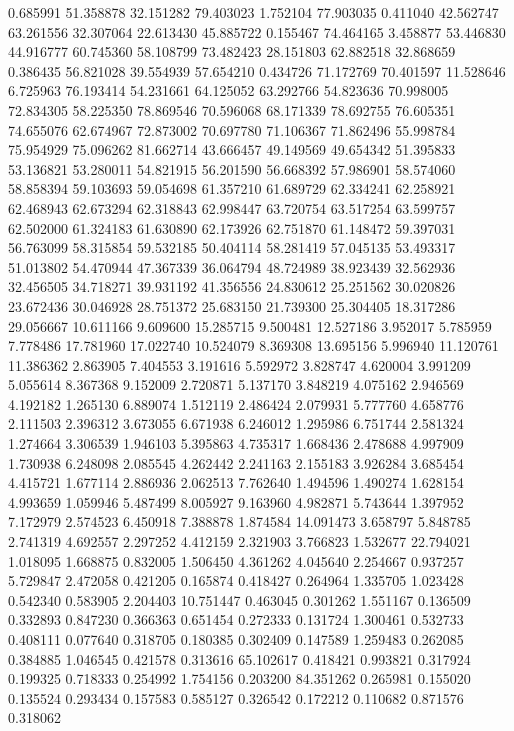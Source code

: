 0.685991
51.358878
32.151282
79.403023
1.752104
77.903035
0.411040
42.562747
63.261556
32.307064
22.613430
45.885722
0.155467
74.464165
3.458877
53.446830
44.916777
60.745360
58.108799
73.482423
28.151803
62.882518
32.868659
0.386435
56.821028
39.554939
57.654210
0.434726
71.172769
70.401597
11.528646
6.725963
76.193414
54.231661
64.125052
63.292766
54.823636
70.998005
72.834305
58.225350
78.869546
70.596068
68.171339
78.692755
76.605351
74.655076
62.674967
72.873002
70.697780
71.106367
71.862496
55.998784
75.954929
75.096262
81.662714
43.666457
49.149569
49.654342
51.395833
53.136821
53.280011
54.821915
56.201590
56.668392
57.986901
58.574060
58.858394
59.103693
59.054698
61.357210
61.689729
62.334241
62.258921
62.468943
62.673294
62.318843
62.998447
63.720754
63.517254
63.599757
62.502000
61.324183
61.630890
62.173926
62.751870
61.148472
59.397031
56.763099
58.315854
59.532185
50.404114
58.281419
57.045135
53.493317
51.013802
54.470944
47.367339
36.064794
48.724989
38.923439
32.562936
32.456505
34.718271
39.931192
41.356556
24.830612
25.251562
30.020826
23.672436
30.046928
28.751372
25.683150
21.739300
25.304405
18.317286
29.056667
10.611166
9.609600
15.285715
9.500481
12.527186
3.952017
5.785959
7.778486
17.781960
17.022740
10.524079
8.369308
13.695156
5.996940
11.120761
11.386362
2.863905
7.404553
3.191616
5.592972
3.828747
4.620004
3.991209
5.055614
8.367368
9.152009
2.720871
5.137170
3.848219
4.075162
2.946569
4.192182
1.265130
6.889074
1.512119
2.486424
2.079931
5.777760
4.658776
2.111503
2.396312
3.673055
6.671938
6.246012
1.295986
6.751744
2.581324
1.274664
3.306539
1.946103
5.395863
4.735317
1.668436
2.478688
4.997909
1.730938
6.248098
2.085545
4.262442
2.241163
2.155183
3.926284
3.685454
4.415721
1.677114
2.886936
2.062513
7.762640
1.494596
1.490274
1.628154
4.993659
1.059946
5.487499
8.005927
9.163960
4.982871
5.743644
1.397952
7.172979
2.574523
6.450918
7.388878
1.874584
14.091473
3.658797
5.848785
2.741319
4.692557
2.297252
4.412159
2.321903
3.766823
1.532677
22.794021
1.018095
1.668875
0.832005
1.506450
4.361262
4.045640
2.254667
0.937257
5.729847
2.472058
0.421205
0.165874
0.418427
0.264964
1.335705
1.023428
0.542340
0.583905
2.204403
10.751447
0.463045
0.301262
1.551167
0.136509
0.332893
0.847230
0.366363
0.651454
0.272333
0.131724
1.300461
0.532733
0.408111
0.077640
0.318705
0.180385
0.302409
0.147589
1.259483
0.262085
0.384885
1.046545
0.421578
0.313616
65.102617
0.418421
0.993821
0.317924
0.199325
0.718333
0.254992
1.754156
0.203200
84.351262
0.265981
0.155020
0.135524
0.293434
0.157583
0.585127
0.326542
0.172212
0.110682
0.871576
0.318062
